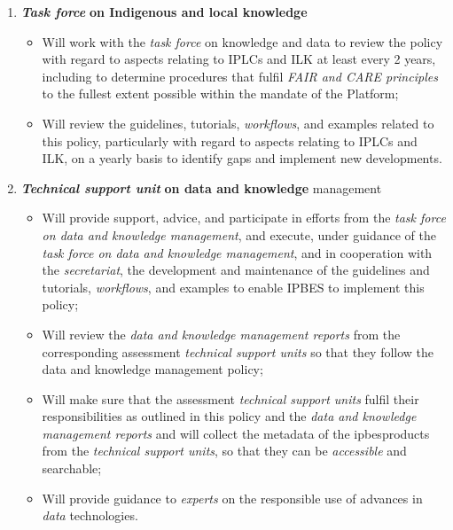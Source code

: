 \documentclass{article}
\begin{document}
\begin{enumerate}[label=(\alph*)]
    \item \textit{\textbf{Task force}}\textbf{ on Indigenous and local knowledge}
    \begin{itemize}
        \item Will work with the \textit{task force} on knowledge and data to review the policy with regard to aspects relating to IPLCs and ILK at least every 2 years, including to determine procedures that fulfil \textit{FAIR and CARE principles} to the fullest extent possible within the mandate of the Platform;
        \item Will review the guidelines, tutorials, \textit{workflows}, and examples related to this policy, particularly with regard to aspects relating to IPLCs and ILK, on a yearly basis to identify gaps and implement new developments.
    \end{itemize}

    \item \textit{\textbf{Technical support unit}}\textbf{ on data and knowledge} management
    \begin{itemize}
        \item Will provide support, advice, and participate in efforts from the \textit{task force on data and knowledge management}, and execute, under guidance of the \textit{task force on data and knowledge management}, and in cooperation with the \textit{secretariat}, the development and maintenance of the guidelines and tutorials, \textit{workflows}, and examples to enable IPBES to implement this policy;
        \item Will review the\textit{ data and knowledge management reports} from the corresponding assessment \textit{technical support units }so that they follow the data and knowledge management policy;
        \item Will make sure that the assessment \textit{technical support units} fulfil their responsibilities as outlined in this policy and the \textit{data and knowledge management reports} and will collect the metadata of the \gls{ipbesproducts }from the \textit{technical support units}, so that they can be \textit{accessible} and searchable;
        \item Will provide guidance to \textit{experts} on the responsible use of advances in \textit{data} technologies.
    \end{itemize}


\end{enumerate}
\end{document}
